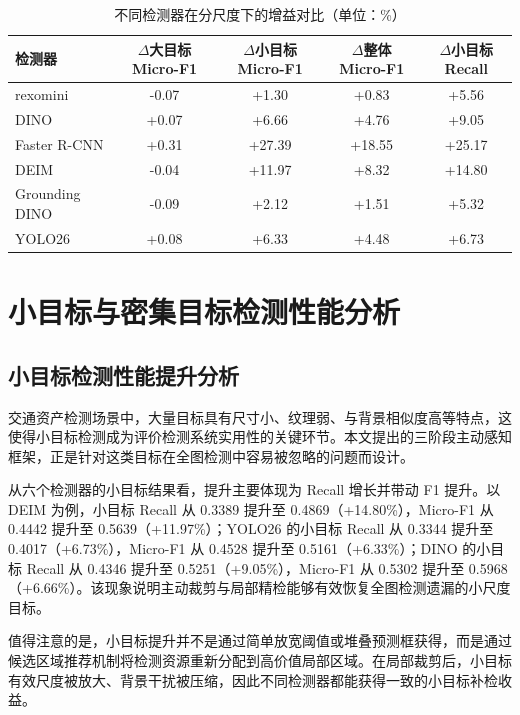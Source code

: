 \begin{table}[htbp]
    \centering
    \caption{不同检测器在分尺度下的增益对比（单位：\%）}
    \label{tab:yolo_scale_results}
    \begin{tabular}{lcccc}
        \toprule
        检测器 & $\Delta$大目标 Micro-F1 & $\Delta$小目标 Micro-F1 & $\Delta$整体 Micro-F1 & $\Delta$小目标 Recall \\
        \midrule
        rexomini & -0.07 & +1.30 & +0.83 & +5.56 \\
        DINO & +0.07 & +6.66 & +4.76 & +9.05 \\
        Faster R-CNN & +0.31 & +27.39 & +18.55 & +25.17 \\
        DEIM & -0.04 & +11.97 & +8.32 & +14.80 \\
        Grounding DINO & -0.09 & +2.12 & +1.51 & +5.32 \\
        YOLO26 & +0.08 & +6.33 & +4.48 & +6.73 \\
        \bottomrule
    \end{tabular}
\end{table}


\section{小目标与密集目标检测性能分析}
\label{sec:small_dense_analysis}

\subsection{小目标检测性能提升分析}
\label{subsec:small_object_analysis}

交通资产检测场景中，大量目标具有尺寸小、纹理弱、与背景相似度高等特点，这使得小目标检测成为评价检测系统实用性的关键环节。本文提出的三阶段主动感知框架，正是针对这类目标在全图检测中容易被忽略的问题而设计。

从六个检测器的小目标结果看，提升主要体现为 Recall 增长并带动 F1 提升。以 DEIM 为例，小目标 Recall 从 0.3389 提升至 0.4869（+14.80\%），Micro-F1 从 0.4442 提升至 0.5639（+11.97\%）；YOLO26 的小目标 Recall 从 0.3344 提升至 0.4017（+6.73\%），Micro-F1 从 0.4528 提升至 0.5161（+6.33\%）；DINO 的小目标 Recall 从 0.4346 提升至 0.5251（+9.05\%），Micro-F1 从 0.5302 提升至 0.5968（+6.66\%）。该现象说明主动裁剪与局部精检能够有效恢复全图检测遗漏的小尺度目标。

值得注意的是，小目标提升并不是通过简单放宽阈值或堆叠预测框获得，而是通过候选区域推荐机制将检测资源重新分配到高价值局部区域。在局部裁剪后，小目标有效尺度被放大、背景干扰被压缩，因此不同检测器都能获得一致的小目标补检收益。

